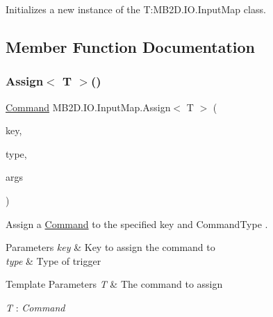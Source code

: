 Initializes a new instance of the T\+:\+M\+B2\+D.\+I\+O.\+Input\+Map class. 



\subsection{Member Function Documentation}
\hypertarget{class_m_b2_d_1_1_i_o_1_1_input_map_a07131c13b291c957512c08aa0d814890}{}\label{class_m_b2_d_1_1_i_o_1_1_input_map_a07131c13b291c957512c08aa0d814890} 
\subsubsection{\texorpdfstring{Assign$<$ T $>$()}{Assign< T >()}}
{\footnotesize\ttfamily \hyperlink{class_m_b2_d_1_1_i_o_1_1_command}{Command} M\+B2\+D.\+I\+O.\+Input\+Map.\+Assign$<$ T $>$ (\begin{DoxyParamCaption}\item[{Keys}]{key,  }\item[{\hyperlink{namespace_m_b2_d_1_1_i_o_ab5f95f3fe9e652778b62bdf943168a68}{Command\+Type}}]{type,  }\item[{params object \mbox{[}$\,$\mbox{]}}]{args }\end{DoxyParamCaption})\hspace{0.3cm}{\ttfamily [inline]}}



Assign a \hyperlink{class_m_b2_d_1_1_i_o_1_1_command}{Command} to the specified key and Command\+Type . 


\begin{DoxyParams}{Parameters}
{\em key} & Key to assign the command to\\
\hline
{\em type} & Type of trigger\\
\hline
\end{DoxyParams}

\begin{DoxyTemplParams}{Template Parameters}
{\em T} & The command to assign\\
\hline
\end{DoxyTemplParams}
\begin{Desc}
\item[Type Constraints]\begin{description}
\item[{\em T} : {\em Command}]\end{description}
\end{Desc}
\hypertarget{class_m_b2_d_1_1_i_o_1_1_input_map_ae5537db7c751ba05196cc71d5f98bf87}{}\label{class_m_b2_d_1_1_i_o_1_1_input_map_ae5537db7c751ba05196cc71d5f98bf87} 
